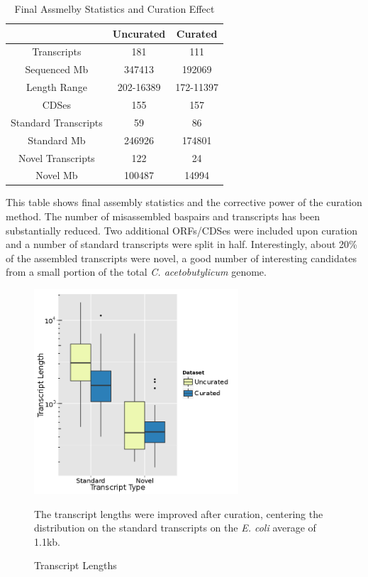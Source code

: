 \begin{table}
\begin{center}
\begin{tabular}{|c|c|c|}\hline
  & Uncurated & Curated\\\hline\hline
Transcripts & 181 & 111\\\hline
Sequenced Mb & 347413 & 192069\\\hline
Length Range & 202-16389 & 172-11397\\\hline
CDSes & 155 & 157\\\hline
Standard Transcripts & 59 & 86\\\hline
Standard Mb & 246926 & 174801\\\hline
Novel Transcripts & 122 & 24\\\hline
Novel Mb & 100487 & 14994\\\hline
\end{tabular}
\end{center}
\caption{Final Assmelby Statistics and Curation Effect}\label{table:assemb_curation}
This table shows final assembly statistics and the corrective power of the curation method. The number of misassembled baspairs and transcripts has been substantially reduced. Two additional ORFs/CDSes were included upon curation and a number of standard transcripts were split in half. Interestingly, about 20\% of the assembled transcripts were novel, a good number of interesting candidates from a small portion of the total \textit{C. acetobutylicum} genome.
\end{table}

\begin{figure}
\small
\vspace{-20pt}
\begin{center}
\includegraphics[width=\linewidth,height=3in]{images/Assembly/Curation/PairvsCuration_length.png}
\caption{Transcript Lengths}\label{fig:5.20}
The transcript lengths were improved after curation, centering the distribution on the standard transcripts on the \textit{E. coli} average of 1.1kb\cite{86}.
\end{center}
\vspace{-20pt}
\end{figure}

